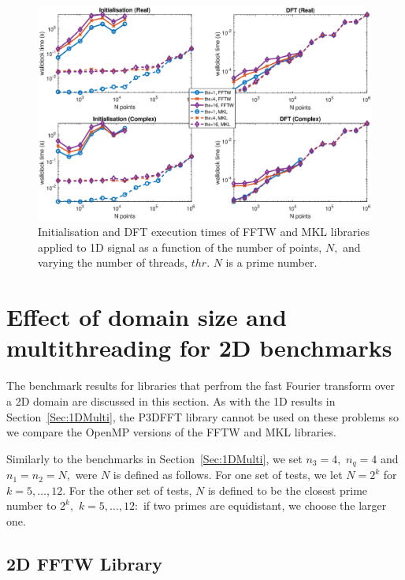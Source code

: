 \documentclass[a4paper]{article}
\begin{document}
\begin{figure}[!htb]
    \centering
    \includegraphics[width=0.9\linewidth]{../results/fftw_mkl_prime_1d_thr.eps}
  \caption{Initialisation and DFT execution times of FFTW and MKL libraries applied to 1D signal as a function of the
    number of points, $N,$ and varying the number of threads, $thr.$ $N$ is a prime number.}
  \label{1DFFTWMKLPrime}
\end{figure}


\section{Effect of domain size and multithreading for 2D benchmarks}\label{Sec:2DMulti}
The benchmark results for libraries that perfrom the fast Fourier
transform over a 2D domain are discussed in this section. As with the
1D results in Section~\ref{Sec:1DMulti}, the P3DFFT library cannot be
used on these problems so we compare the OpenMP versions of the FFTW
and MKL libraries.

Similarly to the benchmarks in Section~\ref{Sec:1DMulti}, we set
$n_3=4,$ $n_q=4$ and $n_1=n_2=N,$ were $N$ is defined as follows.  For one
set of tests, we let $N=2^k$ for $k=5,\ldots,12.$ For the other set of
tests, $N$ is defined to be the closest prime number to $2^k,$
$k=5,\ldots,12:$ if two primes are equidistant, we choose the larger
one.

\subsection{2D FFTW Library}\label{Sec:2DFFTW}
\end{document}
